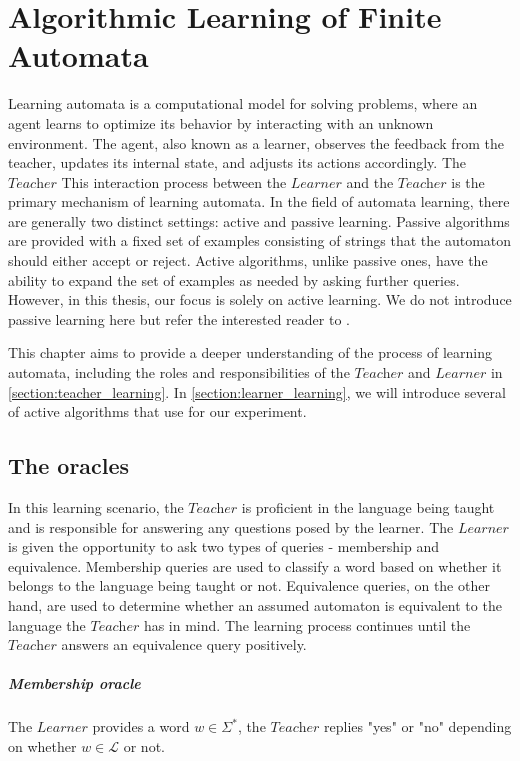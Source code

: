 \chapter{Algorithmic Learning of Finite Automata}\label{chapter:learning_algorithm}
Learning automata is a computational model for solving problems, where an agent learns 
to optimize its behavior by interacting with an unknown environment. 
The agent, also known as a learner, 
observes the feedback from the teacher, updates its internal state, and adjusts its 
actions accordingly. The $\textit{Teacher}$ 
This interaction process between the $\textit{Learner}$ and the $\textit{Teacher}$ 
is the primary mechanism of learning automata.
In the field of automata learning, there are generally two distinct settings: 
active and passive learning. Passive algorithms are provided with a fixed set of 
examples consisting of strings that the automaton should either accept or reject. 
Active algorithms, unlike passive ones, have the ability to expand the set of examples as needed
by asking further queries.
However, in this thesis, our focus is solely on active learning.
We do not introduce passive learning here but refer the interested reader to \cite*{clarke2009model}.

This chapter aims to provide a deeper understanding of the process of learning automata, 
including the roles and responsibilities of the $\textit{Teacher}$ and $\textit{Learner}$ in \autoref{section:teacher_learning}. 
In \autoref{section:learner_learning}, we will introduce several of active algorithms 
that use for our experiment.
\section{The oracles}\label{section:teacher_learning}
In this learning scenario, the $\textit{Teacher}$ is proficient in the language being taught 
and is responsible for answering any questions posed by the learner. The $\textit{Learner}$ 
is given the opportunity to ask two types of queries - membership and equivalence. 
Membership queries are used to classify a word based on whether it belongs to the 
language being taught or not. Equivalence queries, on the other hand, are used to 
determine whether an assumed automaton is equivalent to the language the $\textit{Teacher}$ has 
in mind. The learning process continues until the $\textit{Teacher}$ answers an equivalence query 
positively.
\paragraph*{Membership oracle} 
The $\textit{Learner}$ provides a word $w \in \Sigma^{*}$, the $\textit{Teacher}$ replies "yes" 
or "no" depending on whether $w \in \mathcal{L}$ or not.
